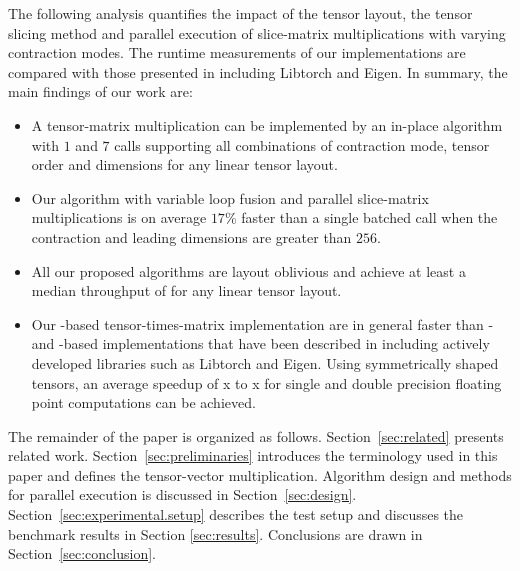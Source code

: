 The following analysis quantifies the impact of the tensor layout, the tensor slicing method and parallel execution of slice-matrix multiplications with varying contraction modes.
The runtime measurements of our implementations are compared with those presented in \cite{springer:2018:design, matthews:2018:high} including Libtorch and Eigen.
In summary, the main findings of our work are:
\begin{itemize}
	\item 
	A tensor-matrix multiplication can be implemented by an in-place algorithm with $1$  and $7$  calls supporting all combinations of contraction mode, tensor order and dimensions for any linear tensor layout.
	\item 
	Our algorithm with variable loop fusion and parallel slice-matrix multiplications is on average $17$\% faster than a single batched  call when the contraction and leading dimensions are greater than $256$.
	\item 
	All our proposed algorithms are layout oblivious and achieve at least a median throughput of \tq for any linear tensor layout.
	\item
	Our -based tensor-times-matrix implementation are in general faster than - and -based implementations that have been described in \cite{springer:2018:design, matthews:2018:high} including actively developed libraries such as Libtorch and Eigen.
	Using symmetrically shaped tensors, an average speedup of \tq x to \tq x for single and double precision floating point computations can be achieved.
	
\end{itemize}

The remainder of the paper is organized as follows. 
Section~\ref{sec:related} presents related work.
Section~\ref{sec:preliminaries} introduces the terminology used in this paper and defines the tensor-vector multiplication.
Algorithm design and methods for parallel execution is discussed in Section~\ref{sec:design}.
Section~\ref{sec:experimental.setup} describes the test setup and discusses the benchmark results in Section \ref{sec:results}.
Conclusions are drawn in Section~\ref{sec:conclusion}.



